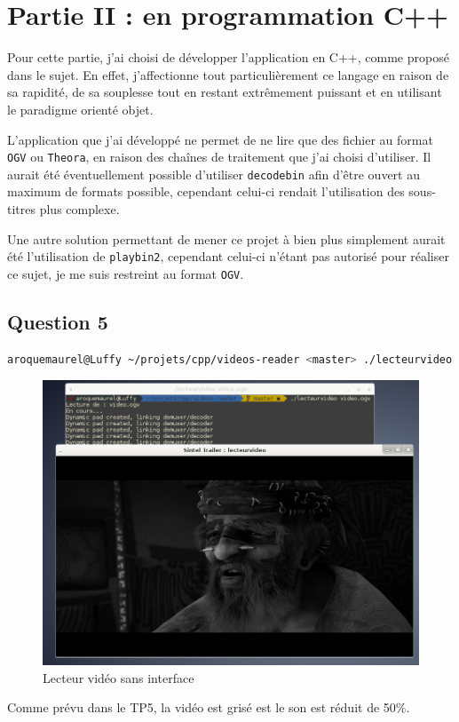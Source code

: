 \documentclass[a4paper, 11pt]{article}
\begin{document}
	\section{Partie II : en programmation C++}
	Pour cette partie, j'ai choisi de développer l'application en C++, comme proposé dans le sujet. En effet, j'affectionne tout particulièrement ce langage en
	raison de sa rapidité, de sa souplesse tout en restant extrêmement puissant et en utilisant le paradigme orienté objet.

	L'application que j'ai développé ne permet de ne lire que des fichier au format \texttt{OGV} ou \texttt{Theora}, en raison des chaînes de traitement que j'ai
	choisi d'utiliser. Il aurait été éventuellement possible d'utiliser \texttt{decodebin} afin d'être ouvert au maximum de formats possible, cependant celui-ci
	rendait l'utilisation des sous-titres plus complexe.

	Une autre solution permettant de mener ce projet à bien plus simplement aurait été l'utilisation de \texttt{playbin2}, cependant celui-ci n'étant pas
	autorisé pour réaliser ce sujet, je me suis restreint au format \texttt{OGV}.

	\subsection{Question 5}
	\begin{lstlisting}[language=sh]
 aroquemaurel@Luffy ~/projets/cpp/videos-reader <master> ./lecteurvideo video.ogv 
	\end{lstlisting}
	\begin{figure}[H]
		\centering
		\includegraphics[width=17cm]{img/1.png}
		\caption{Lecteur vidéo sans interface}
	\end{figure}
	Comme prévu dans le TP5, la vidéo est grisé est le son est réduit de 50\%. 
\end{document}
